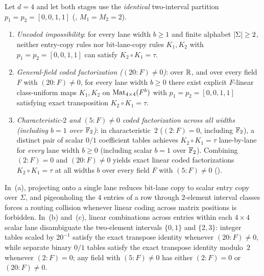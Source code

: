 \begin{example}[Same-interval coded factorizations at $d = 4 = M_1 M_2$]\label{ex:d4-coded}
Let $d = 4$ and let both stages use the \emph{identical} two-interval partition
$p_1 = p_2 = [0, 0, 1, 1]$ (, $M_1 = M_2 = 2$).
\begin{enumerate}[label=(\alph*)]
\item \emph{Uncoded impossibility}: for every lane width $b \ge 1$ and finite alphabet
  $\lvert \Sigma \rvert \ge 2$, neither entry-copy rules nor bit-lane-copy rules $K_1, K_2$ with
  $p_1 = p_2 = [0,0,1,1]$ can satisfy $K_2 \circ K_1 = \tau$.
\item \emph{General-field coded factorization ($(20 : F) \ne 0$)}: over $\mathbb{R}$, and over every field
  $F$ with $(20 : F) \ne 0$, for every lane width $b \ge 0$ there exist explicit $F$-linear
  class-uniform maps $K_1, K_2$ on $\operatorname{Mat}_{4\times 4}(F^b)$ with $p_1 = p_2 = [0,0,1,1]$ satisfying
  exact transposition $K_2 \circ K_1 = \tau$.
\item \emph{Characteristic-$2$ and $(5 : F) \ne 0$ coded factorization across all widths (including
  $b = 1$ over $\mathbb{F}_2$)}: in characteristic~$2$ ($(2 : F) = 0$, including $\mathbb{F}_2$), a distinct pair of
  scalar $0/1$ coefficient tables achieves $K_2 \circ K_1 = \tau$ lane-by-lane for \emph{every}
  lane width $b \ge 0$ (including scalar $b = 1$ over $\mathbb{F}_2$). Combining $(2 : F) = 0$ and
  $(20 : F) \ne 0$ yields exact linear coded factorizations $K_2 \circ K_1 = \tau$ at all widths $b$
  over every field $F$ with $(5 : F) \ne 0$ ().
\end{enumerate}
\end{example}
\begin{outline}
In~(a), projecting onto a single lane reduces bit-lane copy to scalar entry copy over $\Sigma$, and
pigeonholing the $4$ entries of a row through $2$-element interval classes forces a routing
collision whenever linear coding across matrix positions is forbidden. In~(b) and~(c), linear
combinations across entries within each $4\times 4$ scalar lane disambiguate the two-element
intervals $\{0,1\}$ and $\{2,3\}$: integer tables scaled by $20^{-1}$ satisfy the exact transpose
identity whenever $(20 : F) \ne 0$, while separate binary $0/1$ tables satisfy the exact transpose
identity modulo~$2$ whenever $(2 : F) = 0$; any field with $(5 : F) \ne 0$ has either $(2 : F) = 0$
or $(20 : F) \ne 0$.
\end{outline}

